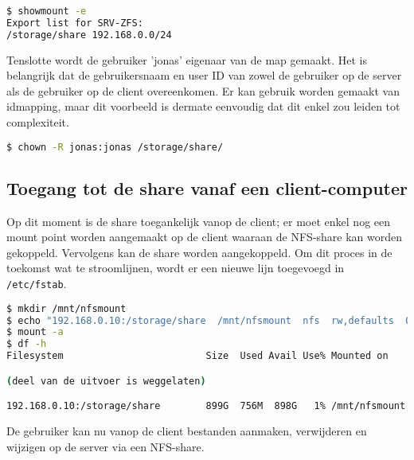 \begin{lstlisting}[language=bash,style=command_style]
$ showmount -e
Export list for SRV-ZFS:
/storage/share 192.168.0.0/24
\end{lstlisting}

Tenslotte wordt de gebruiker 'jonas' eigenaar van de map gemaakt. Het is belangrijk dat de gebruikersnaam en user ID van zowel de gebruiker op de server als de gebruiker op de client overeenkomen. Er kan gebruik worden gemaakt van idmapping, maar dit voorbeeld is dermate eenvoudig dat dit enkel zou leiden tot complexiteit. 

\begin{lstlisting}[language=bash,style=command_style]
$ chown -R jonas:jonas /storage/share/
\end{lstlisting}

\subsection{Toegang tot de share vanaf een client-computer}

Op dit moment is de share toegankelijk vanop de client; er moet enkel nog een mount point worden aangemaakt op de client waaraan de NFS-share kan worden gekoppeld. Vervolgens kan de share worden aangekoppeld. Om dit proces in de toekomst wat te stroomlijnen, wordt er een nieuwe lijn toegevoegd in \texttt{/etc/fstab}.

\begin{lstlisting}[language=bash,style=command_style]
$ mkdir /mnt/nfsmount
$ echo "192.168.0.10:/storage/share  /mnt/nfsmount  nfs  rw,defaults  0 2" >> /etc/fstab
$ mount -a
$ df -h
Filesystem                         Size  Used Avail Use% Mounted on

(deel van de uitvoer is weggelaten)

192.168.0.10:/storage/share        899G  756M  898G   1% /mnt/nfsmount
\end{lstlisting}

De gebruiker kan nu vanop de client bestanden aanmaken, verwijderen en wijzigen op de server via een NFS-share.
